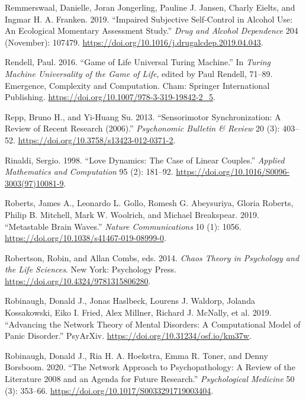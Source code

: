 \documentclass[
  a4paper,
  DIV=11,
  numbers=noendperiod,
  oneside]{scrreprt}
\newlength{\cslhangindent}
\newenvironment{CSLReferences}[2] %
 {\begin{list}{}{%
  \setlength{\itemindent}{0pt}
  \setlength{\leftmargin}{0pt}
  \setlength{\parsep}{0pt}
  \ifodd #1
   \setlength{\leftmargin}{\cslhangindent}
   \setlength{\itemindent}{-1\cslhangindent}
  \fi
  \setlength{\itemsep}{#2\baselineskip}}}
 {\end{list}}
\begin{document}
\begin{CSLReferences}{1}{0}
Remmerswaal, Danielle, Joran Jongerling, Pauline J. Jansen, Charly
Eielts, and Ingmar H. A. Franken. 2019. {``Impaired Subjective
Self-Control in Alcohol Use: {An} Ecological Momentary Assessment
Study.''} \emph{Drug and Alcohol Dependence} 204 (November): 107479.
\url{https://doi.org/10.1016/j.drugalcdep.2019.04.043}.

Rendell, Paul. 2016. {``Game of {Life Universal Turing Machine}.''} In
\emph{Turing {Machine Universality} of the {Game} of {Life}}, edited by
Paul Rendell, 71--89. Emergence, {Complexity} and {Computation}. {Cham}:
{Springer International Publishing}.
\url{https://doi.org/10.1007/978-3-319-19842-2_5}.

Repp, Bruno H., and Yi-Huang Su. 2013. {``Sensorimotor Synchronization:
{A} Review of Recent Research (2006).''}
\emph{Psychonomic Bulletin \& Review} 20 (3): 403--52.
\url{https://doi.org/10.3758/s13423-012-0371-2}.

Rinaldi, Sergio. 1998. {``Love Dynamics: {The} Case of Linear
Couples.''} \emph{Applied Mathematics and Computation} 95 (2): 181--92.
\url{https://doi.org/10.1016/S0096-3003(97)10081-9}.

Roberts, James A., Leonardo L. Gollo, Romesh G. Abeysuriya, Gloria
Roberts, Philip B. Mitchell, Mark W. Woolrich, and Michael Breakspear.
2019. {``Metastable Brain Waves.''} \emph{Nature Communications} 10 (1):
1056. \url{https://doi.org/10.1038/s41467-019-08999-0}.

Robertson, Robin, and Allan Combs, eds. 2014. \emph{Chaos Theory in
{Psychology} and the {Life Sciences}}. {New York}: {Psychology Press}.
\url{https://doi.org/10.4324/9781315806280}.

Robinaugh, Donald J., Jonas Haslbeck, Lourens J. Waldorp, Jolanda
Kossakowski, Eiko I. Fried, Alex Millner, Richard J. McNally, et al.
2019. {``Advancing the {Network Theory} of {Mental Disorders}: {A
Computational Model} of {Panic Disorder}.''} {PsyArXiv}.
\url{https://doi.org/10.31234/osf.io/km37w}.

Robinaugh, Donald J., Ria H. A. Hoekstra, Emma R. Toner, and Denny
Borsboom. 2020. {``The Network Approach to Psychopathology: A Review of
the Literature 2008 and an Agenda for Future
Research.''} \emph{Psychological Medicine} 50 (3): 353--66.
\url{https://doi.org/10.1017/S0033291719003404}.


\end{CSLReferences}
\end{document}
